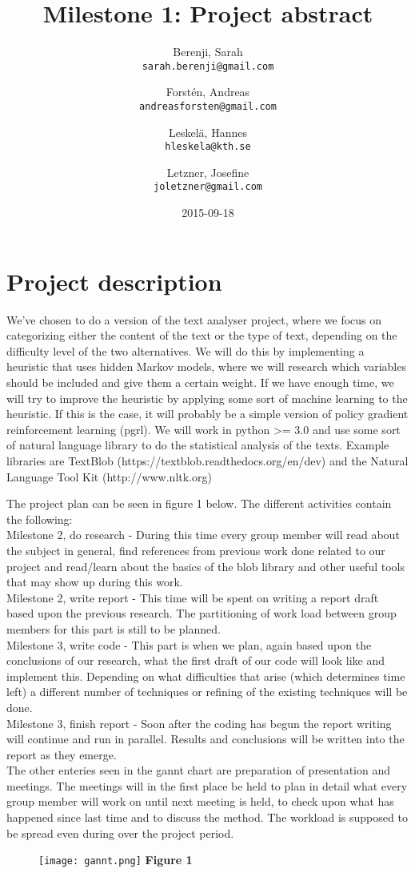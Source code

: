 \documentclass[a4paper]{article}
\title{Milestone 1: Project abstract}
\author{
  Berenji, Sarah\\
  \texttt{sarah.berenji@gmail.com}
  \and
  Forstén, Andreas\\
  \texttt{andreasforsten@gmail.com}
  \and
  Leskelä, Hannes\\
  \texttt{hleskela@kth.se}
  \and
  Letzner, Josefine\\
    \texttt{joletzner@gmail.com}
}
\date{2015-09-18}
\begin{document}
\maketitle
\section*{{Project description}}

We've chosen to do a version of the text analyser project, where we focus on categorizing either the content of the text or the type of text, depending on the difficulty level of the two alternatives. We will do this by implementing a heuristic that uses hidden Markov models, where we will research which variables should be included and give them a certain weight. If we have enough time, we will try to improve the heuristic by applying some sort of machine learning to the heuristic. If this is the case, it will probably be a simple version of policy gradient reinforcement learning (pgrl). We will work in python \textgreater= 3.0 and use some sort of natural language library to do the statistical analysis of the texts. Example libraries are TextBlob (https://textblob.readthedocs.org/en/dev) and the Natural Language Tool Kit (http://www.nltk.org)
\newline

\noindent The project plan can be seen in figure 1 below. The different activities contain the following:\\
Milestone 2, do research - During this time every group member will read about the subject in general, find references from previous work done related to our project and read/learn about the basics of the blob library and other useful tools that may show up during this work.\\
Milestone 2, write report - This time will be spent on writing a report draft based upon the previous research. The partitioning of work load between group members for this part is still to be planned.\\
Milestone 3, write code - This part is when we plan, again based upon the conclusions of our research, what the first draft of our code will look like and implement this. Depending on what difficulties that arise (which determines time left) a different number of techniques or refining of the existing techniques will be done. \\
Milestone 3, finish report - Soon after the coding has begun the report writing will continue and run in parallel. Results and conclusions will be written into the report as they emerge.\\
The other enteries seen in the gannt chart are preparation of presentation and meetings. The meetings will in the first place be held to plan in detail what every group member will work on until next meeting is held, to check upon what has happened since last time and to discuss the method. The workload is supposed to be spread even during over the project period.
  

\begin{figure}[t]

\hspace*{-1.5in}
\texttt{[image: gannt.png]}
\textbf{Figure 1}
\end{figure}
\end{document}
